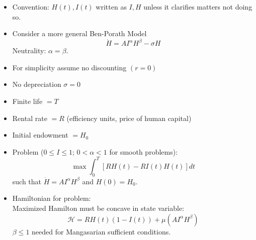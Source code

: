 \documentclass[12pt,compress,handout]{beamer}  %
\begin{document}
\begin{frame}
\begin{itemize}[<+->]
\item
Convention: $H(t),I(t)$ written as $I,H$ unless it clarifies matters not doing so.
\item
Consider a more general Ben-Porath Model
\begin{equation*}
\dot{H}=AI^{\alpha }H^{\beta }-\sigma H
\end{equation*}
Neutrality: $\alpha =\beta$.

\item
For simplicity assume no discounting $(r=0)$

\item
No depreciation $\sigma =0$

\item
Finite life $=T$

\item
Rental rate $=R$ (efficiency units, price of human capital)

\item
Initial endowment $=H_{0}$
\end{itemize}
\end{frame}


\begin{frame}
\begin{itemize}[<+->]
\item Problem ($0\leq I\leq 1$; $0<\alpha <1$ for smooth problems):
\begin{equation*}
\max \int_{0}^{T}[RH(t)-RI(t)H(t)]dt
\end{equation*}
such that $\dot{H} =AI^\alpha H^{\beta }$ and $H(0)=H_0$.

\item
Hamiltonian for problem:\\
Maximized Hamilton must be concave in state variable:
\begin{equation*}
\mathcal{H}=RH(t)(1-I(t))+\mu (AI^\alpha H^\beta )
\end{equation*}
$\beta \leq 1$ needed for Mangasarian sufficient conditions.
\end{itemize}
\end{frame}
\end{document}
